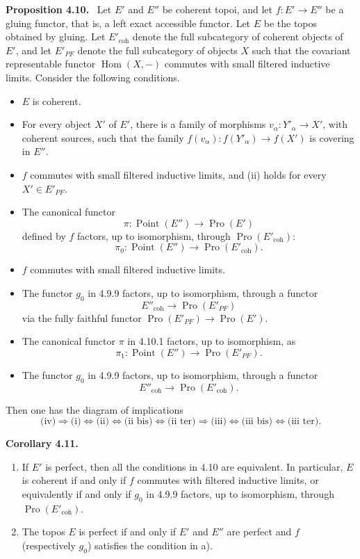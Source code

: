 \documentclass[11pt]{article}
\newcommand{\Hom}{\operatorname{Hom}}
\newcommand{\Pro}{\operatorname{Pro}}
\newcommand{\Ppoint}{\operatorname{Point}}
\newcommand{\coh}{\mathrm{coh}}
\newenvironment{statement}[1]{\par\medskip\noindent\textbf{#1.}\ }{\par\medskip}
\begin{document}
\begin{statement}{Proposition 4.10}
Let \(E'\) and \(E''\) be coherent topoi, and let \(f:E'\to E''\) be a gluing functor, that is, a left exact accessible functor. Let \(E\) be the topos obtained by gluing. Let \(E'_{\coh}\) denote the full subcategory of coherent objects of \(E'\), and let \(E'_{PF}\) denote the full subcategory of objects \(X\) such that the covariant representable functor \(\Hom(X,-)\) commutes with small filtered inductive limits. Consider the following conditions.
\begin{itemize}
\item[(i)] \(E\) is coherent.
\item[(ii)] For every object \(X'\) of \(E'\), there is a family of morphisms \(v_\alpha:Y'_\alpha\to X'\), with coherent sources, such that the family \(f(v_\alpha):f(Y'_\alpha)\to f(X')\) is covering in \(E''\).
\item[(ii bis)] \(f\) commutes with small filtered inductive limits, and (ii) holds for every \(X'\in E'_{PF}\).
\item[(ii ter)] The canonical functor
\[
 \pi:\Ppoint(E'')\to\Pro(E') \tag{4.10.1}
\]
defined by \(f\) factors, up to isomorphism, through \(\Pro(E'_{\coh})\):
\[
 \pi_0:\Ppoint(E'')\to\Pro(E'_{\coh}). \tag{4.10.2}
\]
\item[(iii)] \(f\) commutes with small filtered inductive limits.
\item[(iii bis)] The functor \(g_0\) in 4.9.9 factors, up to isomorphism, through a functor
\[
 E''_{\coh}\to\Pro(E'_{PF}) \tag{4.10.3}
\]
via the fully faithful functor \(\Pro(E'_{PF})\to\Pro(E')\).
\item[(iii ter)] The canonical functor \(\pi\) in 4.10.1 factors, up to isomorphism, as
\[
 \pi_1:\Ppoint(E'')\to\Pro(E'_{PF}). \tag{4.10.4}
\]
\item[(iv)] The functor \(g_0\) in 4.9.9 factors, up to isomorphism, through a functor
\[
 E''_{\coh}\to\Pro(E'_{\coh}). \tag{4.10.5}
\]
\end{itemize}
Then one has the diagram of implications
\[
 \text{(iv)}\Rightarrow\text{(i)}\Leftrightarrow\text{(ii)}\Leftrightarrow\text{(ii bis)}\Leftrightarrow\text{(ii ter)}\Rightarrow\text{(iii)}\Leftrightarrow\text{(iii bis)}\Leftrightarrow\text{(iii ter)}. \tag{4.10.6}
\]
\end{statement}

\begin{statement}{Corollary 4.11}
\begin{enumerate}[label=\alph*)]
\item If \(E'\) is perfect, then all the conditions in 4.10 are equivalent. In particular, \(E\) is coherent if and only if \(f\) commutes with filtered inductive limits, or equivalently if and only if \(g_0\) in 4.9.9 factors, up to isomorphism, through \(\Pro(E'_{\coh})\).
\item The topos \(E\) is perfect if and only if \(E'\) and \(E''\) are perfect and \(f\) (respectively \(g_0\)) satisfies the condition in a).
\end{enumerate}
\end{statement}
\end{document}
